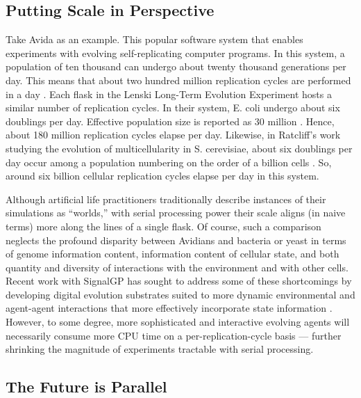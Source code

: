 \subsection{Putting Scale in Perspective}

Take Avida as an example. This popular software system that enables experiments with evolving self-replicating computer programs.
In this system, a population of ten thousand can undergo about twenty thousand generations per day.
This means that about two hundred million replication cycles are performed in a day \cite{ofria2009artificial}.
Each flask in the Lenski Long-Term Evolution Experiment hosts a similar number of replication cycles.
In their system, E. coli undergo about six doublings per day.
Effective population size is reported as 30 million \cite{good2017dynamics}. Hence, about 180 million replication cycles elapse per day.
Likewise, in Ratcliff’s work studying the evolution of multicellularity in S. cerevisiae, about six doublings per day occur among a population numbering on the order of a billion cells \cite{ratcliff2012experimental}.
So, around six billion cellular replication cycles elapse per day in this system.

Although artificial life practitioners traditionally describe instances of their simulations as “worlds,” with serial processing power their scale aligns (in naive terms) more along the lines of a single flask.
Of course, such a comparison neglects the profound disparity between Avidians and bacteria or yeast in terms of genome information content, information content of cellular state, and both quantity and diversity of interactions with the environment and with other cells.
Recent work with SignalGP has sought to address some of these shortcomings by developing digital evolution substrates suited to more dynamic environmental and agent-agent interactions \cite{lalejini2018evolving} that more effectively incorporate state information \cite{lalejini2021tag,lalejini2020case, moreno2019evaluating}.
However, to some degree, more sophisticated and interactive evolving agents will necessarily consume more CPU time on a per-replication-cycle basis --- further shrinking the magnitude of experiments tractable with serial processing.

\subsection{The Future is Parallel}

